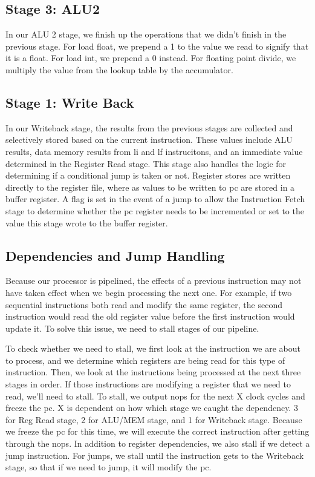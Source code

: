 \documentclass[sigconf]{acmart}
\begin{document}
\subsection{Stage 3: ALU2}
In our ALU 2 stage, we finish up the operations that we didn’t finish in the previous stage. For load float, we prepend a 1 to the value we read to signify that it is a float. For load int, we prepend a 0 instead. For floating point divide, we multiply the value from the lookup table by the accumulator.

\subsection{Stage 1: Write Back}
In our Writeback stage, the results from the previous stages are collected and selectively stored based on the current instruction. These values include ALU results, data memory results from li and lf instrucitons, and an immediate value determined in the Register Read stage. This stage also handles the logic for determining if a conditional jump is taken or not. Register stores are written directly to the register file, where as values to be written to pc are stored in a buffer register. A flag is set in the event of a jump to allow the Instruction Fetch stage to determine whether the pc register needs to be incremented or set to the value this stage wrote to the buffer register. 

\subsection{Dependencies and Jump Handling}
Because our processor is pipelined, the effects of a previous instruction may not have taken effect when we begin processing the next one. For example, if two sequential instructions both read and modify the same register, the second instruction would read the old register value before the first instruction would update it. To solve this issue, we need to stall stages of our pipeline.

To check whether we need to stall, we first look at the instruction we are about to process, and we determine which registers are being read for this type of instruction. Then, we look at the instructions being processed at the next three stages in order. If those instructions are modifying a register that we need to read, we'll need to stall. To stall, we output nops for the next X clock cycles and freeze the pc. X is dependent on how which stage we caught the dependency. 3 for Reg Read stage, 2 for ALU/MEM stage, and 1 for Writeback stage. Because we freeze the pc for this time, we will execute the correct instruction after getting through the nops. In addition to register dependencies, we also stall if we detect a jump instruction. For jumps, we stall until the instruction gets to the Writeback stage, so that if we need to jump, it will modify the pc. 
\end{document}
